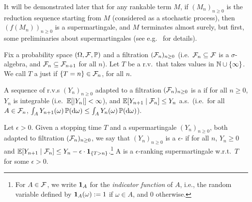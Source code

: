 It will be demonstrated later that for any rankable term $M$, if $(M_n)_{n \geq 0}$ is the reduction sequence starting from $M$ (considered as a stochastic process), then $(f(M_n))_{n \geq 0}$ is a supermartingale, and $M$ terminates almost surely, but first, some preliminaries about supermartingales (see e.g.~\cite{Williams1999,Durrett2019} for details).
\iffalse
\lo{It is confusing (strictly speaking, incorrect) to say that $(M_n)_{n \geq 0}$ is a reduction sequence from $M$. Formally $M_n$ is the random variable $M_n: s \mapsto \pi_0 (\red^n(M, s))$.}
\akr{I guess it's implicitly identifying a sequence of functions ($(M_n)_{n \geq 0}$), and a function producing sequences (a reduction-sequence-valued random variable), but this sort of thing seems very standard in dealing with random variables (e.g.~applying a function to some random variables, which is really a sort of concatenation).}
\fi

Fix a probability space $(\Omega, \mathcal{F}, \mathbb{P})$ and a filtration $(\mathcal{F}_n)_{n \geq 0}$ (i.e.~$\mathcal{F}_n \subseteq \mathcal{F}$ is a $\sigma$-algebra, and $\mathcal{F}_n \subseteq \mathcal{F}_{n+1}$ for all $n$). 
Let $T$ be a r.v.~that takes values in $\mathbb{N} \cup \{\infty\}$.
We call $T$ a  just if $\{T = n\} \in \mathcal{F}_n$, for all $n$.

\begin{definition}\rm
\begin{asparaenum}[(i)]
\item A sequence of r.v.s $(Y_n)_{n \geq 0}$ adapted to a filtration $(\mathcal{F}_n)_{n \geq 0}$ is a  if for all $n \geq 0$, $Y_n$ is integrable (i.e.~$\mathbb{E}[|Y_n|] < \infty$), and $\mathbb{E}[Y_{n+1} \mid \mathcal{F}_n] \leq Y_n$ a.s.~(i.e.~for all $A \in \mathcal{F}_n$, $\int_A Y_{n+1}(\omega) \, \mathbb{P}(\mathrm{d} \omega) \leq \int_A Y_n(\omega) \, \mathbb{P}(\mathrm{d} \omega)$).
\item Let $\epsilon > 0$. 
Given a stopping time $T$ and a supermartingale $(Y_n)_{n \geq 0}$, both adapted to filtration $(\mathcal{F}_n)_{n \geq 0}$, 
we say that $(Y_n)_{n \geq 0}$ is a $\epsilon$- if for all $n$, $Y_n \geq 0$ and $\mathbb{E}[Y_{n+1} \mid \mathcal{F}_n] \leq Y_n - \epsilon \cdot \mathbf{1}_{\{T > n\}}$.\footnote{For $A \in \mathcal{F}$, we write ${\bf 1}_A$ for the \emph{indicator function} of $A$, i.e., the random variable defined by ${\bf 1}_A(\omega) := 1$ if $\omega \in A$, and $0$ otherwise.} %
A  is a $\epsilon$-ranking supermartingale w.r.t.~$T$ for some $\epsilon > 0$.
\end{asparaenum}
\end{definition}

